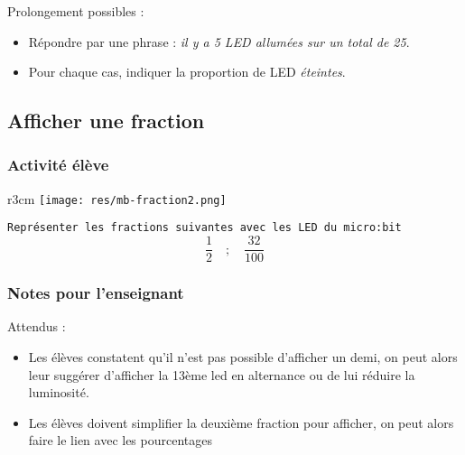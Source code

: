 \begin{remarque}
    Prolongement  possibles :
    \begin{itemize}
        \item Répondre par une phrase : \emph{il y a 5 LED allumées sur un total de 25}.
        \item Pour chaque cas, indiquer la proportion de LED \emph{éteintes}.
    \end{itemize}
\end{remarque}


%
%
\newpage
\subsection{Afficher une fraction}
\subsubsection{Activité élève}


%
%
\begin{wrapfigure}[4]{r}{3cm}
    \texttt{[image: res/mb-fraction2.png]}
\end{wrapfigure}

\begin{eleve}    
    \texttt{Représenter les fractions suivantes avec les LED du micro:bit}
    $$
    \frac{1}{2} \quad ; \quad \frac{32}{100}
    $$
\end{eleve}

%
%
\subsubsection{Notes pour l'enseignant}

Attendus :

\begin{itemize}
    \item Les élèves constatent qu’il n’est pas possible d’afficher un demi, on peut alors leur suggérer d’afficher la 13ème led en alternance ou de lui réduire la luminosité.
    \item Les élèves doivent simplifier la deuxième fraction pour afficher, on peut alors faire le lien avec les pourcentages
\end{itemize}


